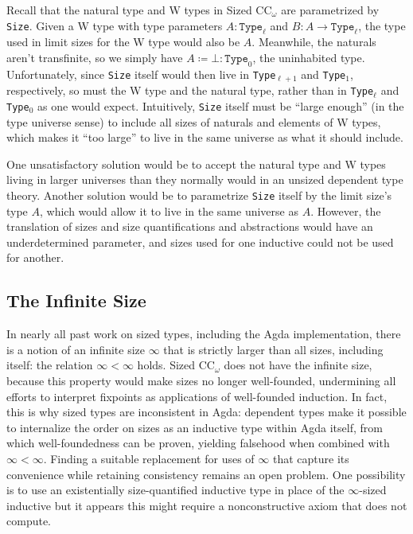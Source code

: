 \documentclass[acmsmall,nonacm, screen]{acmart}
\newcommand{\lang}{Sized CC$_\omega$\xspace}
\begin{document}
Recall that the natural type and W types in \lang are parametrized by \texttt{Size}.
Given a W type with type parameters $A : \texttt{Type}_\ell$ and $B : A \rightarrow \texttt{Type}_\ell$,
the type used in limit sizes for the W type would also be $A$.
Meanwhile, the naturals aren't transfinite, so we simply have $A \coloneq \bot : \texttt{Type}_0$, the uninhabited type.
Unfortunately, since \texttt{Size} itself would then live in
\texttt{Type}$_{\ell+1}$ and \texttt{Type}$_1$, respectively,
so must the W type and the natural type,
rather than in \texttt{Type}$_{\ell}$ and \texttt{Type}$_0$ as one would expect.
Intuitively, \texttt{Size} itself must be ``large enough'' (in the type universe sense)
to include all sizes of naturals and elements of W types,
which makes it ``too large'' to live in the same universe as what it should include.

One unsatisfactory solution would be to accept the natural type and W types living in larger universes
than they normally would in an unsized dependent type theory.
Another solution would be to parametrize \texttt{Size} itself by the limit size's type $A$,
which would allow it to live in the same universe as $A$.
However, the translation of sizes and size quantifications and abstractions would have
an underdetermined parameter, and sizes used for one inductive could not be used for another.

\subsection{The Infinite Size}

In nearly all past work on sized types, including the Agda implementation,
there is a notion of an infinite size $\infty$ that is strictly larger than all sizes,
including itself: the relation $\infty < \infty$ holds.
\lang does not have the infinite size, because this property would make sizes no longer well-founded,
undermining all efforts to interpret fixpoints as applications of well-founded induction.
In fact, this is why sized types are inconsistent in Agda:
dependent types make it possible to internalize the order on sizes as an inductive type within Agda itself,
from which well-foundedness can be proven, yielding falsehood when combined with $\infty < \infty$.
Finding a suitable replacement for uses of $\infty$ that capture its convenience while retaining consistency
remains an open problem.
One possibility is to use an existentially size-quantified inductive type in place of the $\infty$-sized inductive%
but it appears this might require a nonconstructive axiom that does not compute.
\end{document}
